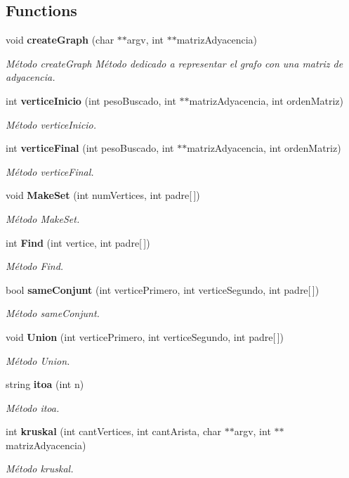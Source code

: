 \subsection*{Functions}
\begin{DoxyCompactItemize}
\item 
void {\bf create\+Graph} (char $\ast$$\ast$argv, int $\ast$$\ast$matriz\+Adyacencia)
\begin{DoxyCompactList}\small\item\em Método create\+Graph Método dedicado a representar el grafo con una matriz de adyacencia. \end{DoxyCompactList}\item 
int {\bf vertice\+Inicio} (int peso\+Buscado, int $\ast$$\ast$matriz\+Adyacencia, int orden\+Matriz)
\begin{DoxyCompactList}\small\item\em Método vertice\+Inicio. \end{DoxyCompactList}\item 
int {\bf vertice\+Final} (int peso\+Buscado, int $\ast$$\ast$matriz\+Adyacencia, int orden\+Matriz)
\begin{DoxyCompactList}\small\item\em Método vertice\+Final. \end{DoxyCompactList}\item 
void {\bf Make\+Set} (int num\+Vertices, int padre[$\,$])
\begin{DoxyCompactList}\small\item\em Método Make\+Set. \end{DoxyCompactList}\item 
int {\bf Find} (int vertice, int padre[$\,$])
\begin{DoxyCompactList}\small\item\em Método Find. \end{DoxyCompactList}\item 
bool {\bf same\+Conjunt} (int vertice\+Primero, int vertice\+Segundo, int padre[$\,$])
\begin{DoxyCompactList}\small\item\em Método same\+Conjunt. \end{DoxyCompactList}\item 
void {\bf Union} (int vertice\+Primero, int vertice\+Segundo, int padre[$\,$])
\begin{DoxyCompactList}\small\item\em Método Union. \end{DoxyCompactList}\item 
string {\bf itoa} (int n)
\begin{DoxyCompactList}\small\item\em Método itoa. \end{DoxyCompactList}\item 
int {\bf kruskal} (int cant\+Vertices, int cant\+Arista, char $\ast$$\ast$argv, int $\ast$$\ast$matriz\+Adyacencia)
\begin{DoxyCompactList}\small\item\em Método kruskal. \end{DoxyCompactList}\end{DoxyCompactItemize}


